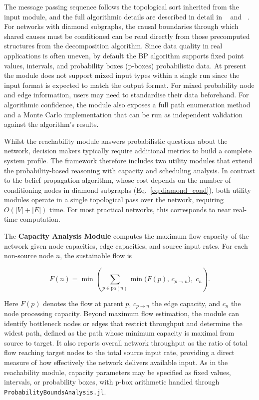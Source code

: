 \documentclass[twocolumn]{rps-esrel2026}
\begin{document}
The message passing sequence follows the topological sort inherited from the input module, and the full algorithmic details are described in detail in ~\cite{infoprop2026} and ~\cite{infoprop2026_julia}. For networks with diamond subgraphs, the causal boundaries through which shared causes must be conditioned can be read directly from those precomputed structures from the decomposition algorithm. Since data quality in real applications is often uneven, by default the BP algorithm supports fixed point values, intervals, and probability boxes (p-boxes) probabilistic data. At present the module does not support mixed input types within a single run since the input format is expected to match the output format. For mixed probability node and edge information, users may need to standardise their data beforehand. For algorithmic confidence, the module also exposes a full path enumeration method and a Monte Carlo implementation that can be run as independent validation against the algorithm’s results.

Whilst the reachability module answers probabilistic questions about the network, decision makers typically require additional metrics to build a complete system profile. The framework therefore includes two utility modules that extend the probability-based reasoning with capacity and scheduling analysis. In contrast to the belief propagation algorithm, whose cost depends on the number of conditioning nodes in diamond subgraphs (Eq.~\ref{eq:diamond_cond}), both utility modules operate in a single topological pass over the network, requiring $O(|V| + |E|)$ time. For most practical networks, this corresponds to near real-time computation.

The \textbf{Capacity Analysis Module} computes the maximum flow capacity of the network given node capacities, edge capacities, and source input rates. For each non-source node $n$, the sustainable flow is

\begin{equation}\label{eq:maxflow}
F(n) = \min\!\left(\sum_{p \in \mathrm{pa}(n)}
\min\bigl(F(p),\, c_{p \to n}\bigr),\; c_n\right).
\end{equation}

Here $F(p)$ denotes the flow at parent $p$, $c_{p \to n}$ the edge capacity, and $c_n$ the node processing capacity. Beyond maximum flow estimation, the module can identify bottleneck nodes or edges that restrict throughput and determine the widest path, defined as the path whose minimum capacity is maximal from source to target. It also reports overall network throughput as the ratio of total flow reaching target nodes to the total source input rate, providing a direct measure of how effectively the network delivers available input. As in the reachability module, capacity parameters may be specified as fixed values, intervals, or probability boxes, with p-box arithmetic handled through \texttt{ProbabilityBoundsAnalysis.jl}.
\end{document}
